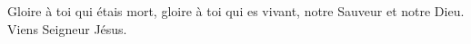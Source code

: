 Gloire à toi qui étais mort, gloire à toi qui es vivant,
notre Sauveur et notre Dieu. Viens Seigneur Jésus.
